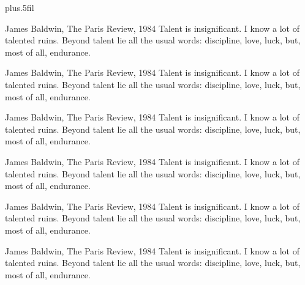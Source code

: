 \begin{epigraph}
\vskip0pt plus.5fil
\setsinglespacing

\begin{epiquote}{James Baldwin, The Paris Review, 1984}
Talent is insignificant. I know a lot of talented ruins.
Beyond talent lie all the usual words: discipline, love, luck, but, most of all, endurance.
\end{epiquote}

\begin{epiquote}{James Baldwin, The Paris Review, 1984}
Talent is insignificant. I know a lot of talented ruins.
Beyond talent lie all the usual words: discipline, love, luck, but, most of all, endurance.
\end{epiquote}

\begin{epiquote}{James Baldwin, The Paris Review, 1984}
Talent is insignificant. I know a lot of talented ruins.
Beyond talent lie all the usual words: discipline, love, luck, but, most of all, endurance.
\end{epiquote}

\begin{epiquote}{James Baldwin, The Paris Review, 1984}
Talent is insignificant. I know a lot of talented ruins.
Beyond talent lie all the usual words: discipline, love, luck, but, most of all, endurance.
\end{epiquote}

\begin{epiquote}{James Baldwin, The Paris Review, 1984}
Talent is insignificant. I know a lot of talented ruins.
Beyond talent lie all the usual words: discipline, love, luck, but, most of all, endurance.
\end{epiquote}

\begin{epiquote}{James Baldwin, The Paris Review, 1984}
Talent is insignificant. I know a lot of talented ruins.
Beyond talent lie all the usual words: discipline, love, luck, but, most of all, endurance.
\end{epiquote}

\end{epigraph}
